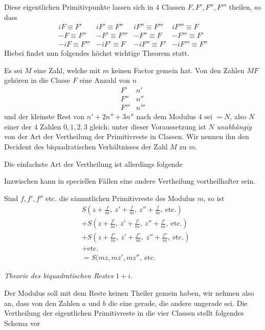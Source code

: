 %
Diese eigentlichen Primitivpunkte lassen sich in $4$ Classen $F,F',F'',F'''$ theilen, so dass
\[
\begin{array}{llll}
iF\equiv F'&iF'\equiv F''&iF''\equiv F'''&iF'''\equiv F\\
-F\equiv F''&-F'\equiv F'''&-F''\equiv F&-F'''\equiv F'\\
-iF\equiv F'''&-iF'\equiv F&-iF''\equiv F'&-iF'''\equiv F''
\end{array}
\]
Hiebei findet nun folgendes höchst wichtige Theorem statt.

Es sei $M$ eine Zahl, welche mit $m$ keinen Factor gemein hat. Von den Zahlen $MF$ gehören in die Classe $F$ eine Anzahl von $n$
\[
\begin{array}{cc}F'&n'\\F''&n''\\F'''&n'''\end{array}
\]
und der kleinste Rest von $n'+2n''+3n''$ nach dem Modulus $4$ sei $=N$, also $N$ einer der $4$ Zahlen $0,1,2,3$ gleich: unter dieser Voraussetzung ist $N$ \emph{unabhängig} von der Art der Vertheilung der Primitivreste in Classen. Wir nennen ihn den Decident des biquadratischen Verhältnisses der Zahl $M$ zu $m$.

Die einfachste Art der Vertheilung ist allerdings folgende
\begin{center}\resizebox{.35\textwidth}{!}{}\end{center}
Inzwischen kann in speciellen Fällen eine andere Vertheilung vortheilhafter sein.

Sind $f,f',f''$ etc. die sämmtlichen Primitivreste des Modulus $m$, so ist
%
\[
\begin{aligned}
&S(z+\tfrac fm,\ z'+\tfrac fm,\ z''+\tfrac fm,\ \text{etc.})\\
&+S(z+\tfrac{f'}m,\ z'+\tfrac{f'}m,\ z''+\tfrac{f'}m,\ \text{etc.})\\
&+S(z+\tfrac{f''}m,\ z'+\tfrac{f''}m,\ z''+\tfrac{f''}m,\ \text{etc.})\\
&+\text{etc.}\\
&=S(mz,mz',mz'',\ \text{etc.}
\end{aligned}
\]

\begin{center}\emph{Theorie des biquadratischen Restes} $1+i$.\end{center}
Der Modulus soll mit dem Reste keinen Theiler gemein haben, wir nehmen also an, dass von den Zahlen $a$ und $b$ die eine gerade, die andere ungerade sei. Die Vertheilung der eigentlichen Primitivreste in die vier Classen stellt folgendes Schema vor
\begin{center}\resizebox{.90\textwidth}{!}{}\end{center}

